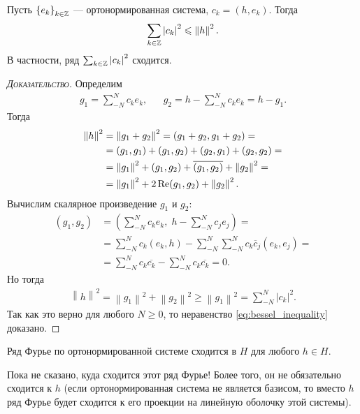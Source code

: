 \documentclass[../complex-analysis.tex]{subfiles}
\begin{document}
\begin{claim}
 Пусть $ \left\{e_k\right\}_{k \in \mathbb{Z}}  $ --- ортонормированная система, $ c_k = (h,e_k) $. Тогда 
 \begin{align}
  \label{eq:bessel_inequality}
  \sum_{k \in\mathbb{Z}} \left| c_k \right|^{2} \leqslant \left\| h \right\|^{2}.
 \end{align} В частности, ряд $ \sum_{k \in \mathbb{Z}} \left| c_k \right|^{2} $ сходится.
\end{claim}
\begin{proof}[\normalfont\textsc{Доказательство}]
 Определим
 \begin{align*}
  g_1 = \sum_{-N}^{N}c_ke_k, && g_2 = h - \sum_{-N}^{N}c_ke_k = h - g_1.
 \end{align*} Тогда
 \begin{align*}
  \left\| h \right\|^{2} &= \left\| g_1 + g_2 \right\|^{2} = (g_1+g_2,g_1+g_2) = \\
  &= (g_1,g_1) + (g_1,g_2) + (g_2,g_1) + (g_2,g_2) = \\
  &= \left\| g_1 \right\|^{2} + (g_1, g_2) + \overline{(g_1,g_2)} + \left\| g_2 \right\|^{2} = \\
  &= \left\| g_1 \right\|^{2} + 2 \operatorname{Re} (g_1,g_2) + \left\| g_2 \right\|^{2}.
 \end{align*}
 Вычислим скалярное произведение $ g_1 $ и $ g_2 $:
 \begin{align*}
  (g_1,g_2) &= \left( \sum_{-N}^{N}c_ke_k,\; h - \sum_{-N}^{N} c_je_j \right) = \\
  &=  \sum_{-N}^{N}c_k(e_k,h)  - \sum_{-N}^{N} \sum_{-N}^{N} c_k \overline c_j (e_k, e_j) = \\
  &= \sum_{-N}^{N} c_k \overline{c_k} - \sum_{-N}^{N}c_k \overline{c_k} = 0.
 \end{align*} Но тогда
 \begin{align*}
  \left\| h \right\|^{2} = \left\| g_1 \right\|^{2} + \left\| g_2 \right\|^{2} \geqslant \left\| g_1 \right\|^{2} = \sum_{-N}^{N}\left| c_k \right|^{2}.
 \end{align*} Так как это верно для любого $ N \geqslant 0 $, то неравенство \eqref{eq:bessel_inequality} доказано.
\end{proof}

\begin{claim}
 \label{claim:fourier_series_convergence}
 Ряд Фурье по ортонормированной системе сходится в $ H $ для любого $ h \in H $.
\end{claim}

Пока не сказано, куда сходится этот ряд Фурье! Более того, он не обязательно сходится к $ h $ (если ортонормированная система не является базисом, то вместо $ h $ ряд Фурье будет сходится к его проекции на линейную оболочку этой системы).
\end{document}
